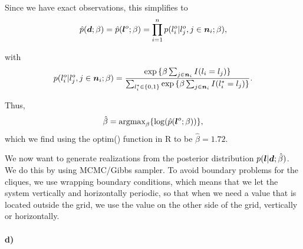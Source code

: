 Since we have exact observations, this simplifies to 
\begin{equation*}
    \hat{p}(\bm{d}; \beta) = \hat{p}(\bm{l}^o; \beta) = \prod_{i=1}^n p(l_i^o|l_j^o, j\in \bm{n}_i; \beta), 
\end{equation*}

with 
\begin{equation*}
    p(l_i^o|l_j^o, j\in \bm{n}_i; \beta) = \frac{\exp{\{\beta \sum_{j\in \bm{n}_i} I(l_i = l_j)\}}}{\sum_{l_i^*\in \{0,1\}}\exp{\{\beta \sum_{j\in \bm{n}_i} I(l_i^* = l_j)\}}}.
\end{equation*}

Thus, 
\begin{equation*}
    \hat\beta = \textrm{argmax}_{\beta} \{\log(\hat{p}(\bm{l}^o; \beta))\},
\end{equation*}
which we find using the optim() function in R to be $\hat\beta = 1.72$.

We now want to generate realizations from the posterior distribution $p(\bm{l}|\bm{d}; \hat\beta)$. We do this by using MCMC/Gibbs sampler. To avoid boundary problems for the cliques, we use wrapping boundary conditions, which means that we let the system vertically and horizontally periodic, so that when we need a value that is located outside the grid, we use the value on the other side of the grid, vertically or horizontally.


\paragraph{d)}


